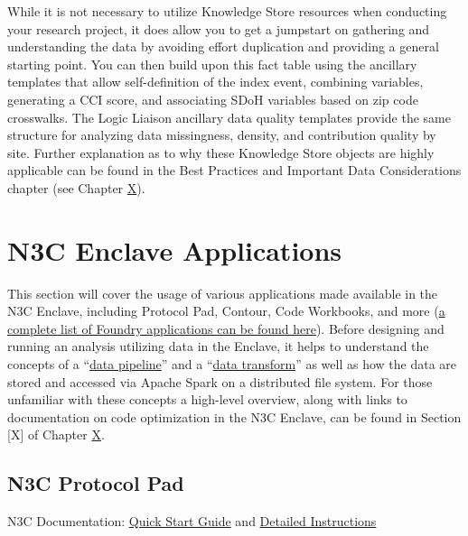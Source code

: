 \documentclass[
  letterpaper,
  DIV=11,
  numbers=noendperiod]{scrreprt}
\begin{document}
While it is not necessary to utilize Knowledge Store resources when
conducting your research project, it does allow you to get a jumpstart
on gathering and understanding the data by avoiding effort duplication
and providing a general starting point. You can then build upon this
fact table using the ancillary templates that allow self-definition of
the index event, combining variables, generating a CCI score, and
associating SDoH variables based on zip code crosswalks. The Logic
Liaison ancillary data quality templates provide the same structure for
analyzing data missingness, density, and contribution quality by site.
Further explanation as to why these Knowledge Store objects are highly
applicable can be found in the Best Practices and Important Data
Considerations chapter (see Chapter
\protect\hyperlink{Best-Practices-and-Important-Data-Considerations}{X}).

\hypertarget{n3c-enclave-applications}{%
\section{N3C Enclave Applications}\label{n3c-enclave-applications}}

This section will cover the usage of various applications made available
in the N3C Enclave, including Protocol Pad, Contour, Code Workbooks, and
more
(\href{https://www.palantir.com/docs/foundry/getting-started/application-reference/}{a
complete list of Foundry applications can be found here}). Before
designing and running an analysis utilizing data in the Enclave, it
helps to understand the concepts of a
``\href{https://www.palantir.com/docs/foundry/data-integration/data-pipeline/}{data
pipeline}'' and a
``\href{https://www.palantir.com/docs/foundry/pipeline-builder/core-concepts/}{data
transform}'' as well as how the data are stored and accessed via Apache
Spark on a distributed file system. For those unfamiliar with these
concepts a high-level overview, along with links to documentation on
code optimization in the N3C Enclave, can be found in Section {[}X{]} of
Chapter \protect\hyperlink{ux3fux3fux3f}{X}.

\hypertarget{n3c-protocol-pad}{%
\subsection{N3C Protocol Pad}\label{n3c-protocol-pad}}

N3C Documentation:
\href{https://unite.nih.gov/workspace/notepad/view/ri.notepad.main.notepad.8e97750f-d764-4df9-bb25-42ab32fcaa26}{Quick
Start Guide} and
\href{https://unite.nih.gov/workspace/notepad/view/ri.notepad.main.notepad.9d509aa3-7c76-42b3-a891-076a6f450f37}{Detailed
Instructions}
\end{document}
